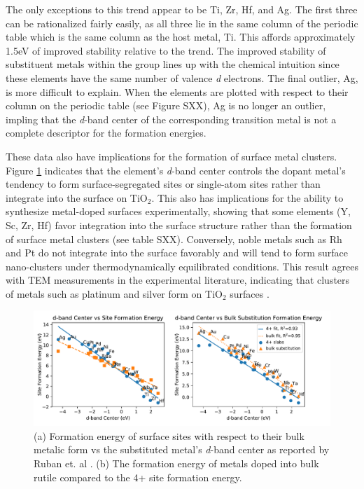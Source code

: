 The only exceptions to this trend appear to be Ti, Zr, Hf, and Ag. The first three can be rationalized fairly easily, as all three lie in the same column of the periodic table which is the same column as the host metal, Ti. This affords approximately 1.5eV of improved stability relative to the trend. The improved stability of substituent metals within the group lines up with the chemical intuition since these elements have the same number of valence \textit{d} electrons. The final outlier, Ag, is more difficult to explain. When the elements are plotted with respect to their column on the periodic table (see Figure SXX), Ag is no longer an outlier, impling that the \textit{d}-band center of the corresponding transition metal is not a complete descriptor for the formation energies.

These data also have implications for the formation of surface metal clusters. Figure \ref{fig:d_band} indicates that the element's \textit{d}-band center controls the dopant metal's tendency to form surface-segregated sites or single-atom sites rather than integrate into the surface on TiO$_2$. This also has implications for the ability to synthesize metal-doped surfaces experimentally, showing that some elements (Y, Sc, Zr, Hf) favor integration into the surface structure rather than the formation of surface metal clusters (see table SXX). Conversely, noble metals such as Rh and Pt do not integrate into the surface favorably and will tend to form surface nano-clusters under thermodynamically equilibrated conditions. This result agrees with TEM measurements in the experimental literature, indicating that clusters of metals such as platinum and silver form on TiO$_2$ surfaces \cite{Iliev_2006}. %

\begin{figure}
    \centering
    \includegraphics[width=0.9\linewidth]{Images/d_band_vs_bulk_formation.pdf}
    \caption{(a) Formation energy of surface sites with respect to their bulk metalic form vs the substituted metal's \textit{d}-band center as reported by Ruban et. al \cite{Ruban_1997}. (b) The formation energy of metals doped into bulk rutile compared to the 4+ site formation energy.}
    \label{fig:d_band}
\end{figure}

